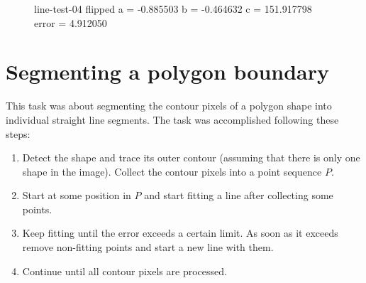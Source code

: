 \begin{figure}
\begin{minipage}[t]{0.32\linewidth}
		\caption{line-test-04 flipped \break a = -0.885503 \break b = -0.464632 \break c = 151.917798 \break error = 4.912050}
	\end{minipage}
\end{figure}


\section{Segmenting a polygon boundary}
This task was about segmenting the contour pixels of a polygon shape into individual straight line segments. The task was accomplished following these steps:
\begin{enumerate}
	\item Detect the shape and trace its outer contour (assuming that there is only one shape in the image). Collect the contour pixels into a point sequence $P$.
	\item Start at some position in $P$ and start fitting a line after collecting some points.
	\item Keep fitting until the error exceeds a certain limit. As soon as it exceeds remove non-fitting points and start a new line with them.
	\item Continue until all contour pixels are processed.
\end{enumerate}

